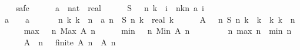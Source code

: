 \begin{isabellebody}
\ \ \isamarkupfalse%
\ safe\isanewline
\ \ \ \ \isamarkupfalse%
\ a\ {\isacharcolon}{\isacharcolon}\ {\isachardoublequoteopen}nat\ {\isasymRightarrow}\ real{\isachardoublequoteclose}\isanewline
\ \ \ \ \isamarkupfalse%
\ {\isacharquery}S\ {\isacharequal}\ {\isachardoublequoteopen}{\isasymlambda}\ n\ k{\isachardot}\ {\isacharparenleft}{\isasymSum}\ i\ {\isasymleftarrow}\ {\isacharbrackleft}n{\isacharminus}k{\isachardot}{\isachardot}{\isacharless}n{\isacharbrackright}{\isachardot}\ a\ i{\isacharparenright}{\isachardoublequoteclose}\isanewline
\ \ \ \ \isamarkupfalse%
\ {\isachardoublequoteopen}a\ {}\ {\isacharequal}\ {}{\isachardoublequoteclose}\ {\isachardoublequoteopen}a\ {}\ {\isacharequal}\ {}{\isachardoublequoteclose}\ \ {\isacharasterisk}{\isacharcolon}\ {\isachardoublequoteopen}\ {\isasymforall}n{\isasymge}{}{\isachardot}\ {\isasymexists}k{\isasymge}{}{\isachardot}\ k\ {\isasymle}\ n\ {\isasymand}\ a\ n\ {\isacharequal}\ {\isacharquery}S\ n\ k\ {\isacharslash}\ real\ k{\isachardoublequoteclose}\isanewline
\ \ \ \ \isamarkupfalse%
\ {\isacharquery}A\ {\isacharequal}\ {\isachardoublequoteopen}{\isasymlambda}\ n{\isachardot}\ {\isacharbraceleft}{\isacharquery}S\ n\ k\ {\isacharslash}\ k\ {\isacharbar}\ k{\isachardot}\ k\ {\isasymin}\ {\isacharbraceleft}{}{\isachardot}{\isachardot}{\isacharless}n{\isacharplus}{}{\isacharbraceright}{\isacharbraceright}{\isachardoublequoteclose}\isanewline
\ \ \ \ \isamarkupfalse%
\ {\isacharquery}max\ {\isacharequal}\ {\isachardoublequoteopen}{\isasymlambda}\ n{\isachardot}\ Max\ {\isacharparenleft}{\isacharquery}A\ n{\isacharparenright}{\isachardoublequoteclose}\isanewline
\ \ \ \ \isamarkupfalse%
\ {\isacharquery}min\ {\isacharequal}\ {\isachardoublequoteopen}{\isasymlambda}\ n{\isachardot}\ Min\ {\isacharparenleft}{\isacharquery}A\ n{\isacharparenright}{\isachardoublequoteclose}\isanewline
\ \ \ \ \isamarkupfalse%
\ {\isacharquery}{\isasymDelta}\ {\isacharequal}\ {\isachardoublequoteopen}{\isasymlambda}\ n{\isachardot}\ {\isacharquery}max\ n\ {\isacharminus}\ {\isacharquery}min\ n{\isachardoublequoteclose}\isanewline
\isanewline
\ \ \ \ \isamarkupfalse%
\ A{\isacharcolon}\ {\isachardoublequoteopen}{\isasymforall}\ n\ {\isasymge}\ {}{\isachardot}\ finite\ {\isacharparenleft}{\isacharquery}A\ n{\isacharparenright}\ {\isasymand}\ {\isacharquery}A\ n\ {\isasymnoteq}\ {\isacharbraceleft}{\isacharbraceright}{\isachardoublequoteclose}\isanewline

\end{isabellebody}
